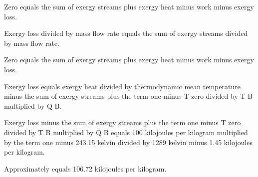 Zero equals the sum of exergy streams plus exergy heat minus work minus exergy loss.  

Exergy loss divided by mass flow rate equals the sum of exergy streams divided by mass flow rate.  

Zero equals the sum of exergy streams plus exergy heat minus work minus exergy loss.  

Exergy loss equals exergy heat divided by thermodynamic mean temperature minus the sum of exergy streams plus the term one minus T zero divided by T B multiplied by Q B.  

Exergy loss minus the sum of exergy streams plus the term one minus T zero divided by T B multiplied by Q B equals 100 kilojoules per kilogram multiplied by the term one minus 243.15 kelvin divided by 1289 kelvin minus 1.45 kilojoules per kilogram.  

Approximately equals 106.72 kilojoules per kilogram.